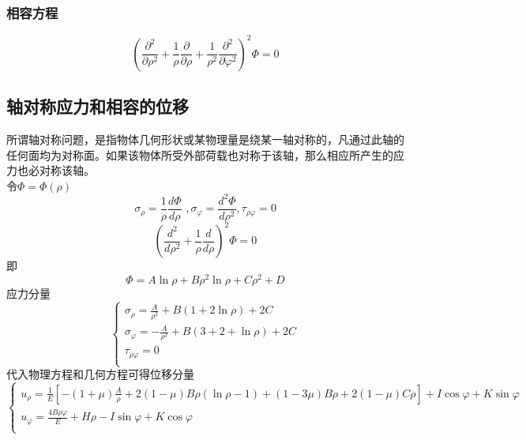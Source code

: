 \subsubsection{相容方程}
\begin{equation}
\left( \frac{\partial ^2}{\partial \rho ^2}+\frac{1}{\rho}\frac{\partial}{\partial \rho}+\frac{1}{\rho ^2}\frac{\partial ^2}{\partial \varphi ^2} \right)^2 \varPhi =0
\end{equation}
\subsection{轴对称应力和相容的位移}
所谓轴对称问题，是指物体几何形状或某物理量是绕某一轴对称的，凡通过此轴的任何面均为对称面。如果该物体所受外部荷载也对称于该轴，那么相应所产生的应力也必对称该轴。
\\
令$\varPhi =\varPhi \left( \rho \right) $
\begin{equation}
\sigma _{\rho}=\frac{1}{\rho}\frac{d\varPhi}{d\rho}\,\,,     \sigma _{\varphi}=\frac{d^2\varPhi}{d\rho ^2},     \tau _{\rho \varphi}=0
\end{equation}
\begin{equation}
\left( \frac{d^2}{d\rho ^2}+\frac{1}{\rho}\frac{d}{d\rho} \right) ^2\varPhi =0
\end{equation}
即
\begin{equation}
\varPhi =A\ln \rho +B\rho ^2\ln \rho +C\rho ^2+D
\end{equation}
应力分量
\begin{equation}
\begin{cases}
\sigma _{\rho}=\frac{A}{\rho ^2}+B\left( 1+2\ln \rho \right) +2C\\
\sigma _{\varphi}=-\frac{A}{\rho ^2}+B\left( 3+2+\ln \rho \right) +2C\\
\tau _{\rho \varphi}=0\\
\end{cases}
\end{equation}
代入物理方程和几何方程可得位移分量
\begin{equation}
\begin{cases}
u_{\rho}=\frac{1}{E}\left[ -\left( 1+\mu \right) \frac{A}{\rho}+2\left( 1-\mu \right) B\rho \left( \ln \rho -1 \right) +\left( 1-3\mu \right) B\rho +2\left( 1-\mu \right) C\rho \right] +I\cos \varphi +K\sin \varphi\\
u_{\varphi}=\frac{4B\rho \varphi}{E}+H\rho -I\sin \varphi +K\cos \varphi\\
\end{cases}
\end{equation}
